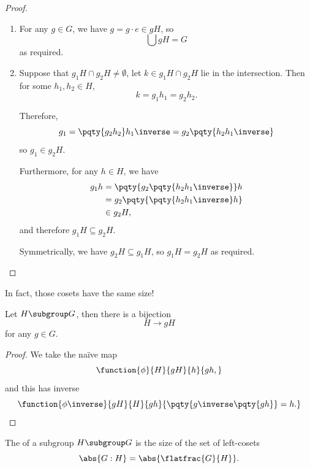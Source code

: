 \begin{proof}
    \begin{enumerate}
        \item For any \(g \in G\), we have \(g = g \cdot e \in gH\), so
        \[
            \bigcup gH = G
        \]
        as required.

        \item Suppose that \(g_1 H \cap g_2 H \neq \emptyset\), let \(k \in g_1 H \cap g_2 H\) lie in the intersection. Then for some \(h_1, h_2 \in H\),
        \[
            k = g_1 h_1 = g_2 h_2.
        \]

        Therefore,
        \[
            g_1 = \pqty{g_2 h_2} h_1\inverse = g_2 \pqty{h_2 h_1\inverse}
        \]
        so \(g_1 \in g_2 H\).

        Furthermore, for any \(h \in H\), we have
        \begin{align*}
            g_1 h &= \pqty{g_2 \pqty{h_2 h_1\inverse}} h \\
            &= g_2 \pqty{\pqty{h_2 h_1\inverse} h} \\
            &\in g_2 H,
        \end{align*}
        and therefore \(g_1 H \subseteq g_2 H\).

        Symmetrically, we have \(g_2 H \subseteq g_1 H\), so \(g_1 H = g_2 H\) as required.
    \end{enumerate}
\end{proof}

In fact, those cosets have the same size!

\begin{lemma}
    \label{lem:cosets-size}%
    Let \(H \subgroup G\), then there is a bijection
    \[
        H \to gH
    \]
    for any \(g \in G\).
\end{lemma}

\begin{proof}
    We take the na\"{i}ve map
    \[
        \function{\phi}{H}{gH}{h}{gh,}
    \]
    and this has inverse
    \[
        \function{\phi\inverse}{gH}{H}{gh}{\pqty{g\inverse \pqty{gh}} = h.}
    \]
\end{proof}

\begin{definition}
    \label{def:index-of-subgroup}%
    The  of a subgroup \(H \subgroup G\) is the size of the set of left-cosets
    \[
        \abs{G : H} = \abs{\flatfrac{G}{H}}.
    \]
\end{definition}

